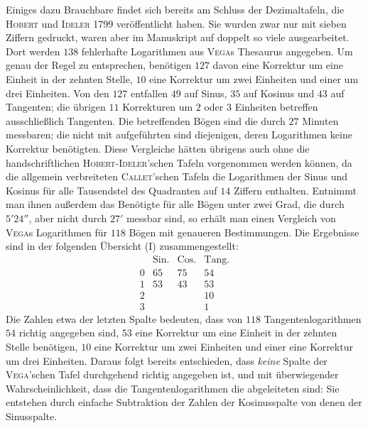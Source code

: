 Einiges dazu Brauchbare findet sich bereits am Schluss der Dezimaltafeln, die \textsc{Hobert} und \textsc{Ideler} 1799 veröffentlicht haben. Sie wurden zwar nur mit sieben Ziffern gedruckt, waren aber im Manuskript auf doppelt so viele ausgearbeitet. Dort werden \(138\) fehlerhafte Logarithmen aus \textsc{Vega}s Thesaurus angegeben. Um genau der Regel zu entsprechen, benötigen \(127\) davon eine Korrektur um eine Einheit in der zehnten Stelle, \(10\) eine Korrektur um zwei Einheiten und einer um drei Einheiten. Von den \(127\) entfallen \(49\) auf Sinus, \(35\) auf Kosinus und \(43\) auf Tangenten; die übrigen \(11\) Korrekturen um \(2\) oder \(3\) Einheiten betreffen ausschließlich Tangenten. Die betreffenden Bögen sind die durch \(27\) Minuten messbaren; die nicht mit aufgeführten sind diejenigen, deren Logarithmen keine Korrektur benötigten. Diese Vergleiche hätten übrigens auch ohne die handschriftlichen \textsc{Hobert-Ideler}'schen Tafeln vorgenommen werden können, da die allgemein verbreiteten \textsc{Callet}'schen Tafeln die Logarithmen der Sinus und Kosinus für alle Tausendstel des Quadranten auf \(14\) Ziffern enthalten. Entnimmt man ihnen außerdem das Benötigte für alle Bögen unter  zwei Grad, die durch \(5'24''\), aber nicht durch \(27'\) messbar sind, so erhält man einen Vergleich von \textsc{Vega}s Logarithmen für \(118\) Bögen mit genaueren Bestimmungen. Die Ergebnisse sind in der folgenden Übersicht (I) zusammengestellt:
\[
\begin{array}{rccc}
 & \mathrm{Sin.} & \mathrm{Cos.} & \mathrm{Tang.} \\
0 & 65 & 75 & 54 \\
1 & 53 & 43 & 53 \\
2 &    &    & 10 \\
3 &    &    & 1
\end{array}
\]
Die Zahlen etwa der letzten Spalte bedeuten, dass von \(118\) Tangentenlogarithmen \(54\) richtig angegeben sind, \(53\) eine Korrektur um eine Einheit in der zehnten Stelle benötigen, \(10\) eine Korrektur um zwei Einheiten und einer eine Korrektur um drei Einheiten. Daraus folgt bereits entschieden, dass \emph{keine} Spalte der \textsc{Vega}'schen Tafel durchgehend richtig angegeben ist, und mit überwiegender Wahrscheinlichkeit, dass die Tangentenlogarithmen die abgeleiteten sind: Sie entstehen durch einfache Subtraktion der Zahlen der Kosinusspalte von denen der Sinusspalte.


